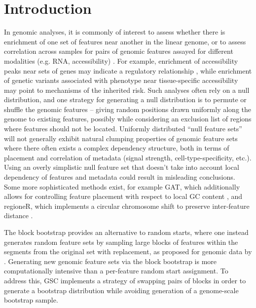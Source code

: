 \section{Introduction}
In genomic analyses, it is commonly of interest to assess whether
there is enrichment of one set of features near another in the
linear genome, or to assess correlation across samples for pairs of
genomic features assayed for different modalities (e.g. RNA,
accessibility) \citep{reviewdilemma2014}.
For example, enrichment of accessibility peaks near sets of genes may
indicate a regulatory relationship \citep{lee2020fluent}, while
enrichment of genetic variants associated with phenotype near
tissue-specific accessibility may point to mechanisms of the inherited
risk.
Such analyses often rely on a null distribution, and one strategy for
generating a null distribution is to permute or shuffle the
genomic features -- giving random positions drawn uniformly along the
genome to existing features, possibly while considering an exclusion
list of regions where features should not be located.
Uniformly distributed ``null feature sets'' will not generally exhibit
natural clumping properties of
genomic feature sets where there often exists a complex
dependency structure, both in terms of placement and correlation of
metadata (signal strength, cell-type-specificity, etc.).
Using an overly simplistic null feature set that doesn't take into
account local dependency of features and metadata could result in
misleading conclusions.
Some more sophisticated methods exist, for example
GAT, which additionally allows for controlling feature placement with
respect to local GC content
\citep{GAT_2013}, and regioneR, which implements a circular chromosome
shift to preserve inter-feature distance \citep{gel2016regioner}.

The block bootstrap \citep{politis1999subsampling}
provides an alternative to random starts, where one instead generates
random feature sets by sampling large blocks of features within the
segments from the original set with replacement, as proposed for genomic data
by \citet{bickel2010subsampling}.
Generating new genomic feature sets via the block bootstrap is more
computationally intensive than a per-feature random start assignment.
To address this, GSC \citep{bickel2010subsampling} implements a
strategy of swapping pairs of blocks in order to generate a bootstrap
distribution while avoiding generation of a genome-scale bootstrap
sample.

